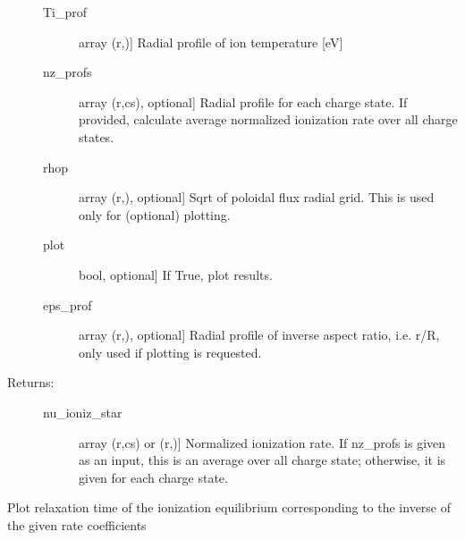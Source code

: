 \documentclass[letterpaper,10pt,english]{sphinxmanual}
\begin{document}
\begin{fulllineitems}
\begin{description}
\begin{description}
\item[{Ti\_prof}] \leavevmode{[}array (r,){]}
Radial profile of ion temperature {[}eV{]}

\item[{nz\_profs}] \leavevmode{[}array (r,cs), optional{]}
Radial profile for each charge state. If provided, calculate average normalized 
ionization rate over all charge states.

\item[{rhop}] \leavevmode{[}array (r,), optional{]}
Sqrt of poloidal flux radial grid. This is used only for (optional) plotting.

\item[{plot}] \leavevmode{[}bool, optional{]}
If True, plot results.

\item[{eps\_prof}] \leavevmode{[}array (r,), optional{]}
Radial profile of inverse aspect ratio, i.e. r/R, only used if plotting is requested.

\end{description}

\item[{Returns:}] \leavevmode\begin{description}
\item[{nu\_ioniz\_star}] \leavevmode{[}array (r,cs) or (r,){]}
Normalized ionization rate. If nz\_profs is given as an input, this is an average over
all charge state; otherwise, it is given for each charge state.

\end{description}

\end{description}

\end{fulllineitems}


\begin{fulllineitems}
\label{\detokenize{aurora:aurora.atomic.plot_relax_time}}
Plot relaxation time of the ionization equilibrium corresponding
to the inverse of the given rate coefficients

\end{fulllineitems}
\end{document}
